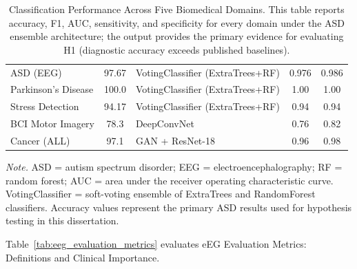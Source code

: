 \begin{table}[!htbp]
\tablestripes\tablefontsize
\tablefontsize
\caption[Classification Performance Across Five Biomedical Domains]{Classification Performance Across Five Biomedical Domains. This table reports accuracy, F1, AUC, sensitivity, and specificity for every domain under the ASD ensemble architecture; the output provides the primary evidence for evaluating H1 (diagnostic accuracy exceeds published baselines).}
\begin{tabularx}{\textwidth}{@{} L C >{\raggedright\arraybackslash}p{3cm} C C @{}}
\toprule
{} &  &  &  &  \\
\midrule
ASD (EEG) & 97.67 & VotingClassifier (ExtraTrees+RF) & 0.976 & 0.986 \\
Parkinson's Disease & 100.0 & VotingClassifier (ExtraTrees+RF) & 1.00 & 1.00 \\
Stress Detection & 94.17 & VotingClassifier (ExtraTrees+RF) & 0.94 & 0.94 \\
BCI Motor Imagery & 78.3 & DeepConvNet & 0.76 & 0.82 \\
Cancer (ALL) & 97.1 & GAN + ResNet-18 & 0.96 & 0.98 \\
\bottomrule
\end{tabularx}
\vspace{0.5em}\noindent\textit{Note.} ASD = autism spectrum disorder; EEG = electroencephalography;  RF = random forest; AUC = area under the receiver operating characteristic curve. VotingClassifier = soft-voting ensemble of ExtraTrees and RandomForest classifiers. Accuracy values represent the primary ASD results used for hypothesis testing in this dissertation.
\end{table}
\fi %

\iffalse %

\noindent Table~\ref{tab:eeg_evaluation_metrics} evaluates eEG Evaluation Metrics: Definitions and Clinical Importance.

